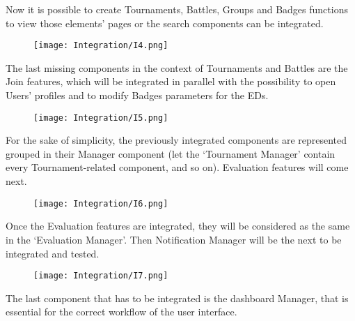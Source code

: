 Now it is possible to create Tournaments, Battles, Groups and Badges functions to view those elements’ pages or the search components can be integrated.


\begin{figure}[H]
    \begin{center}
        \texttt{[image: Integration/I4.png]}
        \label{fig:Integration_4}%
    \end{center}
\end{figure}

The last missing components in the context of Tournaments and Battles are the Join features, which will be integrated in parallel with the possibility to open Users’ profiles and to modify Badges parameters for the EDs.


\begin{figure}[H]
    \begin{center}
        \texttt{[image: Integration/I5.png]}
        \label{fig:Integration_5}%
    \end{center}
\end{figure}

For the sake of simplicity, the previously integrated components are represented grouped in their Manager component (let the ‘Tournament Manager’ contain every Tournament-related component, and so on). Evaluation features will come next.

\begin{figure}[H]
    \begin{center}
        \texttt{[image: Integration/I6.png]}
        \label{fig:Integration_6}%
    \end{center}
\end{figure}

Once the Evaluation features are integrated, they will be considered as the same in the ‘Evaluation Manager’. Then Notification Manager will be the next to be integrated and tested.


\begin{figure}[H]
    \begin{center}
        \texttt{[image: Integration/I7.png]}
        \label{fig:Integration_7}%
    \end{center}
\end{figure}

The last component that has to be integrated is the dashboard Manager, that is essential for the correct workflow of the user interface.


